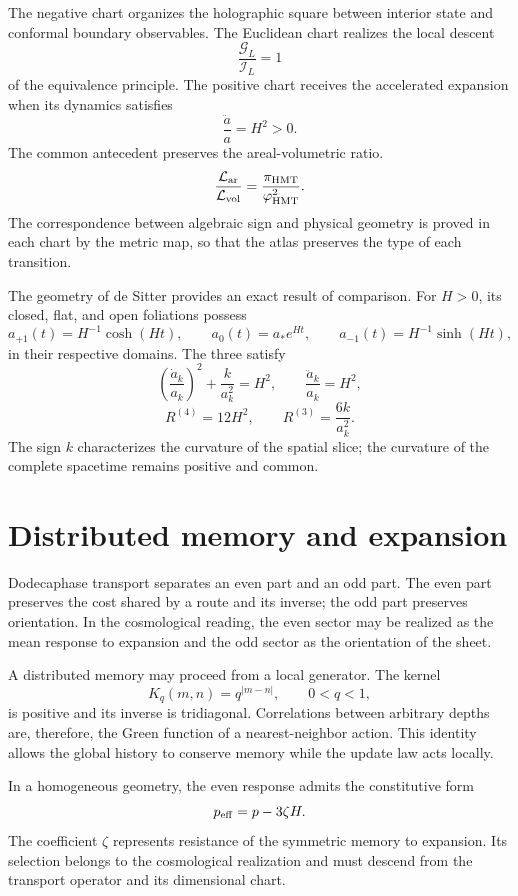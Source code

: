 The negative chart organizes the holographic square between interior state and
conformal boundary observables. The Euclidean chart realizes the local descent
\[
 \frac{\mathcal G_L}{\mathcal I_L}=1
\]
of the equivalence principle. The positive chart receives the accelerated
expansion when its dynamics satisfies
\[
 \frac{\ddot a}{a}=H^2>0.
\]
The common antecedent preserves the areal-volumetric ratio.
\[
 \frac{\mathcal L_{\rm ar}}{\mathcal L_{\rm vol}}
 =\frac{\pi_{\rm HMT}}{\varphi_{\rm HMT}^2}.
\]
The correspondence between algebraic sign and physical geometry is proved in
each chart by the metric map, so that the atlas preserves the type of
each transition.

The geometry of de Sitter provides an exact result of comparison.
For \(H>0\), its closed, flat, and open foliations possess
\[
 a_{+1}(t)=H^{-1}\cosh(Ht),\qquad
 a_0(t)=a_*e^{Ht},\qquad
 a_{-1}(t)=H^{-1}\sinh(Ht),
\]
in their respective domains. The three satisfy
\[
 \left(\frac{\dot a_k}{a_k}\right)^2+\frac{k}{a_k^2}=H^2,
 \qquad
 \frac{\ddot a_k}{a_k}=H^2,
\]
\[
 R^{(4)}=12H^2,\qquad
 R^{(3)}=\frac{6k}{a_k^2}.
\]
The sign \(k\) characterizes the curvature of the spatial slice; the
curvature of the complete spacetime remains positive and common.

\section{Distributed memory and expansion}

Dodecaphase transport separates an even part and an odd part. The even
part preserves the cost shared by a route and its inverse; the odd part preserves
orientation. In the cosmological reading, the even sector may be realized
as the mean response to expansion and the odd sector as the orientation of the
sheet.

A distributed memory may proceed from a local generator. The kernel
\[
 K_q(m,n)=q^{|m-n|},\qquad 0<q<1,
\]
is positive and its inverse is tridiagonal. Correlations between arbitrary
depths are, therefore, the Green function of a nearest-neighbor action. This
identity allows the global history to conserve memory while the update law
acts locally.

In a homogeneous geometry, the even response admits the constitutive form
\[
 p_{\rm eff}=p-3\zeta H.
\]
The coefficient \(\zeta\) represents resistance of the symmetric memory to
expansion. Its selection belongs to the cosmological realization and must
descend from the transport operator and its dimensional chart.


